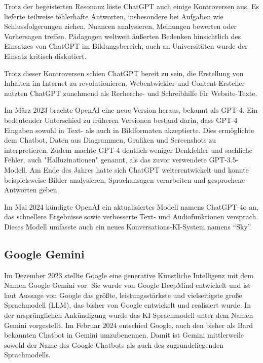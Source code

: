 Trotz der begeisterten Resonanz löste ChatGPT auch einige Kontroversen aus. Es lieferte teilweise fehlerhafte Antworten, 
insbesondere bei Aufgaben wie Schlussfolgerungen ziehen, Nuancen analysieren, Meinungen bewerten oder Vorhersagen treffen. 
Pädagogen weltweit äußerten Bedenken hinsichtlich des Einsatzes von ChatGPT im Bildungsbereich, auch an Universitäten wurde 
der Einsatz kritisch diskutiert.

Trotz dieser Kontroversen schien ChatGPT bereit zu sein, die Erstellung von Inhalten im Internet zu revolutionieren. 
Webentwickler und Content-Ersteller nutzten ChatGPT zunehmend als Recherche- und Schreibhilfe für Website-Texte.

Im März 2023 brachte OpenAI eine neue Version heraus, bekannt als GPT-4. Ein bedeutender Unterschied zu früheren Versionen 
bestand darin, dass GPT-4 Eingaben sowohl in Text- als auch in Bildformaten akzeptierte. Dies ermöglichte dem Chatbot, Daten 
aus Diagrammen, Grafiken und Screenshots zu interpretieren. Zudem machte GPT-4 deutlich weniger Denkfehler und sachliche Fehler, 
auch "Halluzinationen" genannt, als das zuvor verwendete GPT-3.5-Modell. Am Ende des Jahres hatte sich ChatGPT weiterentwickelt 
und konnte beispielsweise Bilder analysieren, Sprachansagen verarbeiten und gesprochene Antworten geben.

Im Mai 2024 kündigte OpenAI ein aktualisiertes Modell namens ChatGPT-4o an, das schnellere Ergebnisse sowie verbesserte 
Text- und Audiofunktionen versprach. Dieses Modell umfasste auch ein neues Konversations-KI-System namens ``Sky''\cite{GrundlagenChatGPT}.

\subsection{Google Gemini}  \label{Google Gemini}

Im Dezember 2023 stellte Google eine generative Künstliche Intelligenz mit dem Namen Google Gemini vor. Sie wurde von Google DeepMind 
entwickelt und ist laut Aussage von Google das größte, leistungsstärkste und vielseitigste große Sprachmodell (LLM), das bisher von 
Google entwickelt und realisiert wurde. In der ursprünglichen Ankündigung wurde das KI-Sprachmodell unter dem Namen Gemini vorgestellt. 
Im Februar 2024 entschied Google, auch den bisher als Bard bekannten Chatbot in Gemini umzubenennen. Damit ist Gemini mittlerweile sowohl
der Name des Google Chatbots als auch des zugrundeliegenden Sprachmodells.

